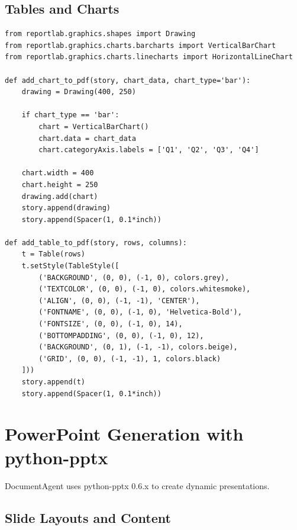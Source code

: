 \documentclass{report}
\begin{document}
\subsection{Tables and Charts}

\begin{lstlisting}
from reportlab.graphics.shapes import Drawing
from reportlab.graphics.charts.barcharts import VerticalBarChart
from reportlab.graphics.charts.linecharts import HorizontalLineChart

def add_chart_to_pdf(story, chart_data, chart_type='bar'):
    drawing = Drawing(400, 250)
    
    if chart_type == 'bar':
        chart = VerticalBarChart()
        chart.data = chart_data
        chart.categoryAxis.labels = ['Q1', 'Q2', 'Q3', 'Q4']
    
    chart.width = 400
    chart.height = 250
    drawing.add(chart)
    story.append(drawing)
    story.append(Spacer(1, 0.1*inch))

def add_table_to_pdf(story, rows, columns):
    t = Table(rows)
    t.setStyle(TableStyle([
        ('BACKGROUND', (0, 0), (-1, 0), colors.grey),
        ('TEXTCOLOR', (0, 0), (-1, 0), colors.whitesmoke),
        ('ALIGN', (0, 0), (-1, -1), 'CENTER'),
        ('FONTNAME', (0, 0), (-1, 0), 'Helvetica-Bold'),
        ('FONTSIZE', (0, 0), (-1, 0), 14),
        ('BOTTOMPADDING', (0, 0), (-1, 0), 12),
        ('BACKGROUND', (0, 1), (-1, -1), colors.beige),
        ('GRID', (0, 0), (-1, -1), 1, colors.black)
    ]))
    story.append(t)
    story.append(Spacer(1, 0.1*inch))
\end{lstlisting}

\section{PowerPoint Generation with python-pptx}

DocumentAgent uses python-pptx 0.6.x to create dynamic presentations.

\subsection{Slide Layouts and Content}
\end{document}
